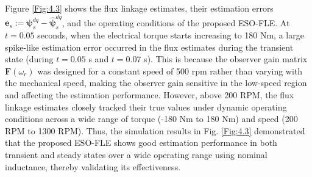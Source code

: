 Figure \ref{Fig:4.3} shows the flux linkage estimates, their estimation errors \(\boldsymbol{e}_s := \boldsymbol{\psi}^{dq}_s - \hat{\boldsymbol{\psi}}^{dq}_s\), and the operating conditions of the proposed ESO-FLE. At $t = 0.05$ seconds, when the electrical torque starts increasing to 180 Nm, a large spike-like estimation error occurred in the flux estimates during the transient state (during $t=0.05$ s and $t=0.07$ s). This is because the observer gain matrix \(\mathbf{F}(\omega_r)\) was designed for a constant speed of 500 rpm rather than varying with the mechanical speed, making the observer gain sensitive in the low-speed region and affecting the estimation performance. However, above 200 RPM, the flux linkage estimates closely tracked their true values under dynamic operating conditions across a wide range of torque (-180 Nm to 180 Nm) and speed (200 RPM to 1300 RPM). Thus, the simulation results in Fig. \ref{Fig:4.3} demonstrated that the proposed ESO-FLE shows good estimation performance in both transient and steady states over a wide operating range using nominal inductance, thereby validating its effectiveness.

